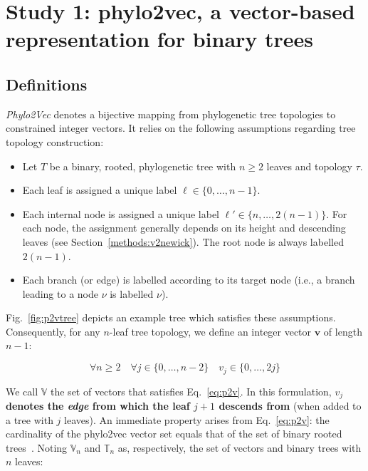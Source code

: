 \section{Study 1: phylo2vec, a vector-based representation for binary trees}
\subsection{Definitions}
\label{p2v:definitions}
\emph{Phylo2Vec} denotes a bijective mapping from phylogenetic tree topologies to constrained integer vectors. It relies on the following assumptions regarding tree topology construction:

\begin{itemize}[nosep]
    \item Let $T$ be a binary, rooted, phylogenetic tree with $n \geq 2$ leaves and topology $\tau$.
    \item Each leaf is assigned a unique label $\ell \in \{0, \ldots, n-1\}$.
    \item Each internal node is assigned a unique label $\ell' \in \{n, \ldots, 2(n-1)\}$. For each node, the assignment generally depends on its height and descending leaves (see Section~\ref{methods:v2newick}). The root node is always labelled $2(n-1)$.
    \item Each branch (or edge) is labelled according to its target node (i.e., a branch leading to a node $\nu$ is labelled $\nu$).
\end{itemize}


Fig.~\ref{fig:p2vtree} depicts an example tree which satisfies these assumptions. Consequently, for any $n$-leaf tree topology, we define an integer vector $\boldsymbol{v}$ of length $n-1$:

\begin{equation}
    \forall n \geq 2 \quad \forall j \in \{0, \ldots, n-2\} \quad v_j \in \{0, \ldots, 2j\}
    \label{eq:p2v}
\end{equation}

We call $\mathbb{V}$ the set of vectors that satisfies Eq.~\ref{eq:p2v}. In this formulation, \textbf{$v_j$ denotes the \emph{edge} from which the leaf $j + 1$ descends from} (when added to a tree with $j$ leaves). An immediate property arises from Eq.~\ref{eq:p2v}: the cardinality of the phylo2vec vector set equals that of the set of binary rooted trees~\cite{cavallisforza1967}. Noting $\mathbb{V}_n$ and $\mathbb{T}_n$ as, respectively, the set of vectors and binary trees with $n$ leaves:

